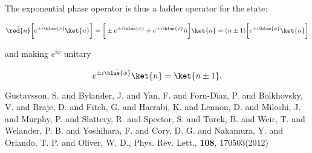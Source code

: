 \begin{thebibliography}{99}
 \vspace{-1em}
 
 The exponential phase operator is thus a ladder operator for the  state:
 
 \vspace{-1em}
 
{\scriptsize \begin{equation}\label{key} 
\hat{\red{n}}\bigg[e^{\pm i\hat{\blue{\phi}}}\ket{n}\bigg] = \bigg[\pm e^{\pm i\hat{\blue{\phi}}} + e^{\pm i\hat{\blue{\phi}}}\hat{n}\bigg]\ket{n} =
 (n\pm 1)\bigg[e^{\pm i\hat{\blue{\phi}}}\ket{n}\bigg]
\end{equation}}

\vspace{-1em}

and making $ e^{i\phi} $ unitary

\vspace{-0.2em}

{\scriptsize \begin{equation}\label{key}
	e^{\pm i\hat{\blue{\phi}}}\ket{n} = \ket{n \pm 1}.
\end{equation}}


{Gustavsson, S. and Bylander, J. and Yan, F. and Forn-D\'{\i}az, P. and Bolkhovsky, V. and Braje, D. and Fitch, G. and Harrabi, K. and Lennon, D. and Miloshi, J. and Murphy, P. and Slattery, R. and Spector, S. and Turek, B. and Weir, T. and Welander, P. B. and Yoshihara, F. and Cory, D. G. and Nakamura, Y. and Orlando, T. P. and Oliver, W. D.}, {Phys. Rev. Lett.}, \textbf{108}, 170503(2012)



\end{thebibliography}